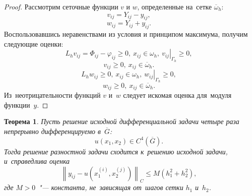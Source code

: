 \documentclass[11pt,a4paper,twoside]{report}
\numberwithin{equation}{section}
\theoremstyle{definition}
\theoremstyle{plain}
\newtheorem{theorem}{Теорема}[section]
\begin{document}
\begin{proof}
    Рассмотрим сеточные функции $v$ и $w$, определенные
    на~сетке $\overline{\omega}_h$:
    $$
        v_{ij} = Y_{ij} - y_{ij},
    $$
    $$
        w_{ij}=Y_{ij}+y_{ij}.
    $$
    Воспользовавшись неравенствами из условия и принципом максимума,
    получим следующие оценки:
    $$
        L_hv_{ij}=\Phi_{ij} - \varphi_{ij} \geqslant 0,~x_{ij}\in\omega_h,
        ~\left.v_{ij}\right\vert_{\Gamma_h} \geqslant 0,
    $$
    $$
        v_{ij} \geqslant 0,~x_{ij}\in\overline{\omega}_h.
    $$
    $$
        L_hw_{ij} \geqslant 0,~x_{ij}\in\omega_h,
        ~\left.w_{ij}\right\vert_{\Gamma_h} \geqslant 0,
    $$
    $$
        w_{ij} \geqslant 0,~x_{ij}\in\overline{\omega}_h.
    $$
    Из~неотрицательности функций $v$ и~$w$ следует искомая оценка
    для~модуля функции~$y$.
\end{proof}
%
%
\begin{theorem}
    Пусть решение исходной дифференциальной задачи четыре раза непрерывно
    дифференцируемо в~$\overline{G}$:
    $$
        u(x_1,x_2) \in C^4\left(\overline{G}\right).
    $$
    Тогда решение разностной задачи сходится к~решению исходной задачи, и~справедлива
    оценка
    $$
        \left\lVert y_{ij}-u\left(x_1^{(i)},x_2^{(j)}\right)\right\rVert_C
        \leqslant M\left(h_1^2+h_2^2\right),
    $$
    где $M > 0$~"--- константа, не~зависящая от~шагов сетки $h_1$ и~$h_2$.
\end{theorem}
%
%
\end{document}
